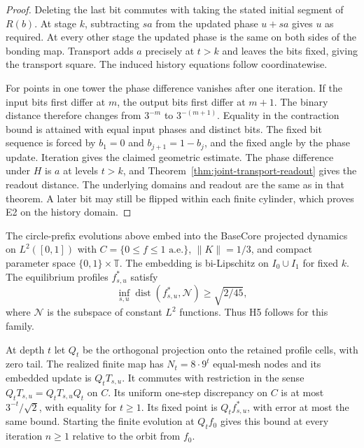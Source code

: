 \begin{proof}
Deleting the last bit commutes with taking the stated initial segment of $R(b)$. At stage $k$, subtracting $sa$ from the updated phase $u+sa$ gives $u$ as required. At every other stage the updated phase is the same on both sides of the bonding map. Transport adds $a$ precisely at $t>k$ and leaves the bits fixed, giving the transport square. The induced history equations follow coordinatewise.

For points in one tower the phase difference vanishes after one iteration. If the input bits first differ at $m$, the output bits first differ at $m+1$. The binary distance therefore changes from $3^{-m}$ to $3^{-(m+1)}$. Equality in the contraction bound is attained with equal input phases and distinct bits. The fixed bit sequence is forced by $b_1=0$ and $b_{j+1}=1-b_j$, and the fixed angle by the phase update. Iteration gives the claimed geometric estimate. The phase difference under $H$ is $a$ at levels $t>k$, and Theorem~\ref{thm:joint-transport-readout} gives the readout distance. The underlying domains and readout are the same as in that theorem. A later bit may still be flipped within each finite cylinder, which proves E2 on the history domain.
\end{proof}

\begin{theorem}\label{thm:hilbert-projective-dissipation}
The circle-prefix evolutions above embed into the BaseCore projected dynamics on $L^2([0,1])$ with $C=\{0\leq f\leq1\text{ a.e.}\}$, $\|K\|=1/3$, and compact parameter space $\{0,1\}\times\mathbb T$. The embedding is bi-Lipschitz on $I_0\cup I_1$ for fixed $k$. The equilibrium profiles $f^\ast_{s,u}$ satisfy
\[
 \inf_{s,u}\operatorname{dist}(f^\ast_{s,u},\mathcal N)\geq\sqrt{2/45},
\]
where $\mathcal N$ is the subspace of constant $L^2$ functions. Thus H5 follows for this family.

At depth $t$ let $Q_t$ be the orthogonal projection onto the retained profile cells, with zero tail. The realized finite map has $N_t=8\cdot 9^t$ equal-mesh nodes and its embedded update is $Q_tT_{s,u}$. It commutes with restriction in the sense $Q_tT_{s,u}=Q_tT_{s,u}Q_t$ on $C$. Its uniform one-step discrepancy on $C$ is at most $3^{-t}/\sqrt{2}$, with equality for $t\geq1$. Its fixed point is $Q_tf^\ast_{s,u}$, with error at most the same bound. Starting the finite evolution at $Q_tf_0$ gives this bound at every iteration $n\geq1$ relative to the orbit from $f_0$.
\end{theorem}

